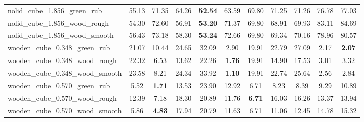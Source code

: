 \begin{table}[H]
{\begin{tabular}{l cccccccccc}
        nolid\_cube\_1.856\_green\_rub & 55.13 & 71.35 & 64.26 & \textbf{52.54} & 63.59 & 69.80 & 71.25 & 71.26 & 76.78 & 77.03 \\
        nolid\_cube\_1.856\_wood\_rough & 54.30 & 72.60 & 56.91 & \textbf{53.20} & 71.37 & 69.80 & 68.91 & 69.93 & 83.11 & 84.69 \\
        nolid\_cube\_1.856\_wood\_smooth & 56.43 & 73.18 & 58.30 & \textbf{53.24} & 72.66 & 69.80 & 69.34 & 70.16 & 78.96 & 80.57 \\
        wooden\_cube\_0.348\_green\_rub & 21.07 & 10.44 & 24.65 & 32.09 & 2.90 & 19.91 & 22.79 & 27.09 & 2.17 & \textbf{2.07} \\
        wooden\_cube\_0.348\_wood\_rough & 22.32 & 6.53 & 13.62 & 22.26 & \textbf{1.76} & 19.91 & 14.90 & 17.53 & 3.01 & 3.32 \\
        wooden\_cube\_0.348\_wood\_smooth & 23.58 & 8.21 & 24.34 & 33.92 & \textbf{1.10} & 19.91 & 22.74 & 25.64 & 2.56 & 2.84 \\
        wooden\_cube\_0.570\_green\_rub & 5.52 & \textbf{1.71} & 13.53 & 23.90 & 12.92 & 6.71 & 8.23 & 8.39 & 9.29 & 10.89 \\
        wooden\_cube\_0.570\_wood\_rough & 12.39 & 7.18 & 18.30 & 20.89 & 11.76 & \textbf{6.71} & 16.03 & 16.26 & 13.37 & 13.94 \\
        wooden\_cube\_0.570\_wood\_smooth & 5.86 & \textbf{4.83} & 17.94 & 20.79 & 11.63 & 6.71 & 11.06 & 12.45 & 14.78 & 15.32 \\
        \bottomrule
    \end{tabular}
    }
\end{table}
